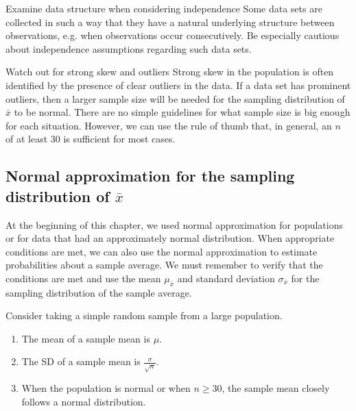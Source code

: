 \begin{caution}
{Examine data structure when considering independence}
{Some data sets are collected in such a way that they have a natural underlying structure between observations, e.g. when observations occur consecutively. Be especially cautious about independence assumptions regarding such data sets.}
\end{caution}

\begin{caution}{Watch out for strong skew and outliers}
{Strong skew in the population is often identified by the presence of clear outliers in the data. If a data set has prominent outliers, then a larger sample size will be needed for the sampling distribution of $\bar{x}$ to be normal.  There are no simple guidelines for what sample size is big enough for each situation.  However, we can use the rule of thumb that, in general, an $n$ of at least 30 is sufficient for most cases.}
\end{caution}



\subsection{Normal approximation for the sampling distribution of $\bar{x}$}

At the beginning of this chapter, we used normal approximation for populations or for data that had an approximately normal distribution.  When appropriate conditions are met, we can also use the normal approximation to estimate probabilities about a sample average.  We must remember to verify that the conditions are met and use the mean $\mu_{\bar{x}}$ and standard deviation $\sigma_{\bar{x}}$ for the sampling distribution of the sample average.


\begin{tipBox}{
Consider taking a simple random sample from a large population.
\begin{enumerate}
\setlength{\itemsep}{0mm}
\item The mean of a sample mean is $\mu$.
\item The SD of a sample mean is $\frac{\sigma}{\sqrt{n}}$.
\item When the population is normal or when $n\ge 30$, the sample mean closely follows a normal distribution. 
\end{enumerate}}
\end{tipBox}


